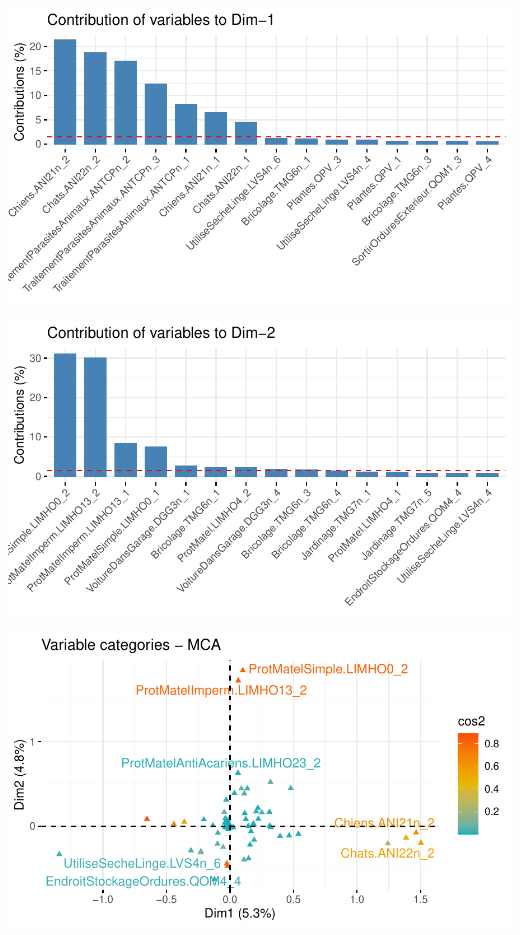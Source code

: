 \documentclass[11pt,a4paper, x11names]{article}\usepackage[]{graphicx}\usepackage[]{color}
\makeatletter
\def\maxwidth{ %
  \ifdim\Gin@nat@width>\linewidth
    \linewidth
  \else
    \Gin@nat@width
  \fi
}
\newenvironment{knitrout}{}{} %
\makeatother
\begin{document}
\vfill
\begin{minipage}{0.49\linewidth}
\begin{mdframed}
\begin{knitrout}
\color{fgcolor}
\includegraphics[width=\maxwidth]{figure/unnamed-chunk-20-1} 

\includegraphics[width=\maxwidth]{figure/unnamed-chunk-20-2} 
\end{knitrout}
\end{mdframed}
\end{minipage}
\hfill
\begin{minipage}{0.49\linewidth}
\begin{mdframed}
\begin{knitrout}
\color{fgcolor}
\includegraphics[width=\maxwidth]{figure/unnamed-chunk-21-1} 
\end{knitrout}
\end{mdframed}
\end{minipage}
\end{document}
